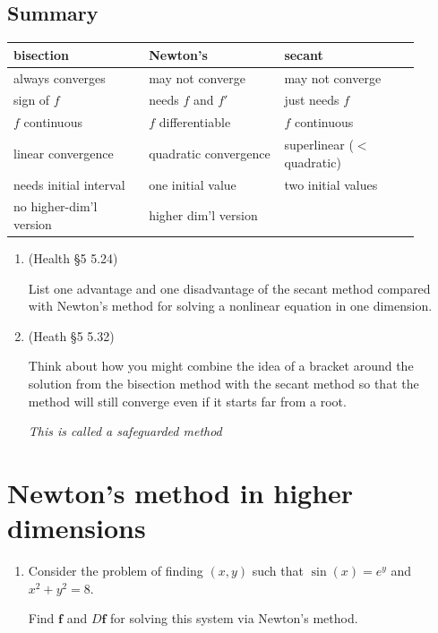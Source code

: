 \documentclass[12pt,letterpaper,noanswers]{exam}
\begin{document}
\subsection*{Summary}
\begin{tabular}{p{0.3\linewidth} p{0.3\linewidth} p{0.3\linewidth}}
bisection & Newton's & secant \\
\hline
always converges & may not converge & may not converge\\
sign of $f$  & needs $f$ and $f'$ & just needs $f$ \\
$f$ continuous & $f$ differentiable & $f$ continuous\\
linear convergence & quadratic convergence & superlinear ($<$ quadratic) \\
needs initial interval & one initial value& two initial values\\
no higher-dim'l version & higher dim'l version & \\
\end{tabular}

\begin{enumerate}[resume]
\item (Health \S5 5.24)

List one advantage and one disadvantage of the secant method compared with Newton's method for solving a nonlinear equation in one dimension.
\vspace{0.5in}

\item (Heath \S5 5.32) 

Think about how you might combine the idea of  a bracket around the solution from the bisection method with the secant method so that the method will still converge even if it starts far from a root.

\emph{This is called a safeguarded method}

\vspace{0.5in}
\end{enumerate}

\section*{Newton's method in higher dimensions}




\begin{enumerate}[resume]
\item Consider the problem of finding $(x,y)$ such that $\sin(x) = e^y$ and $x^2 + y^2 = 8$.

Find $\mathbf{f}$ and $D\mathbf{f}$ for solving this system via Newton's method.
\end{enumerate}
\end{document}
